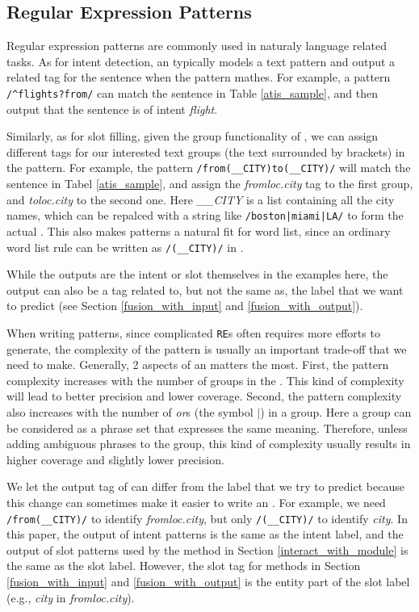 \subsection{Regular Expression Patterns}
\label{re_desc}
Regular expression patterns are commonly used in naturaly language related tasks. As for intent detection, an \RE typically models a text pattern and output a related tag for the sentence when the pattern mathes. For example, a pattern 
\texttt{/\textasciicircum flights?\:from/} can match the sentence in Table \ref{atis_sample}, and then output that the sentence is of intent \emph{flight}. 


Similarly, as for slot filling, given the group functionality of \RE, we can assign different tags for our interested text groups (the text surrounded by brackets) in the pattern. For example, the pattern \texttt{/from\:(\_\_CITY)\:to\:(\_\_CITY)/} will match the sentence in Tabel \ref{atis_sample}, and assign the \emph{fromloc.city} tag to the first group, and \emph{toloc.city} to the second one. Here \emph{\_\_CITY} is a list containing all the city names, which can be repalced with a string like \texttt{/boston|miami|LA/} to form the actual \RE. This also makes \RE patterns a natural fit for word list, since an ordinary word list rule can be written as \texttt{/(\_\_CITY)/} in \RE.

While the outputs are the intent or slot themselves in the examples here, the \RE output can also be a tag related to, but not the same as, the label that we want to predict (see Section \ref{fusion_with_input} and \ref{fusion_with_output}).

When writing \RE patterns, since complicated \texttt{RE}s often requires more efforts to generate, the complexity of the pattern is usually an important trade-off that we need to make. Generally, 2 aspects of an \RE matters the most. First, the pattern complexity increases with the number of groups in the \RE. This kind of complexity will lead to better precision and lower coverage. Second, the pattern complexity also increases with the number of \emph{or}s (the symbol $|$) in a group. Here a group can be considered as a phrase set that expresses the same meaning. Therefore, unless adding ambiguous phrases to the group, this kind of complexity usually results in higher coverage and slightly lower precision.   

We let the output tag of \RE can differ from the label that we try to predict because this change can sometimes make it easier to write an \RE. For example, we need \texttt{/from\:(\_\_CITY)/} to identify \emph{fromloc.city}, but only \texttt{/(\_\_CITY)/} to identify \emph{city}. In this paper, the output of intent patterns is the same as the intent label, and the output of slot patterns used by the method in Section \ref{interact_with_module} is the same as the slot label. However, the slot \RE tag for methods in Section \ref{fusion_with_input} and \ref{fusion_with_output} is the entity part of the slot label (e.g., \emph{city} in \emph{fromloc.city}). 



